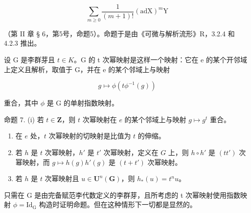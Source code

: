 \[
\sum_ {m \geqslant 0} \frac {1}{(m + 1) !} (\mathrm{adX}) ^ {m} \mathrm{Y}
\]

（第 II 章 § 6，第5号，命题5）。命题于是由《可微与解析流形》R，3.2.4 和 4.2.3 推出。

设 G 是李群芽且 \(t \in K\)。G 的 t 次幂映射是这样一个映射：它在 e 的某个开邻域上定义且解析，取值于 G，并在 e 的某个邻域上与映射

\[
g \mapsto \phi (t \phi^ {- 1} (g))
\]

重合，其中 \(\phi\) 是 G 的单射指数映射。

命题 7. (i) 若 \(t \in \mathbf{Z}\)，则 \(t\) 次幂映射在 \(e\) 的某个邻域上与映射 \(g \mapsto g^t\) 重合。

\begin{enumerate}
\def\labelenumi{(\roman{enumi})}
\setcounter{enumi}{1}
\item
  在 \(e\) 处，\(t\) 次幂映射的切映射是比值为 \(t\) 的伸缩。
\item
  若 \(h\) 是 \(t\) 次幂映射，\(h'\) 是 \(t'\) 次幂映射，定义在 \(G\) 上，则 \(h \circ h'\) 是 \((tt')\) 次幂映射，而 \(g \mapsto h(g)h'(g)\) 是 \((t + t')\) 次幂映射。
\item
  若 \(h\) 是 \(t\) 次幂映射且 \(u \in \mathbf{U}^n(\mathbf{G})\)，则 \(h_*(u) = t^n u\)。
\end{enumerate}

只需在 G 是由完备赋范李代数定义的李群芽，且所考虑的 t 次幂映射使用指数映射 \(\phi = \mathrm{Id}_{\mathrm{G}}\) 构造时证明命题。但在这种情形下一切都是显然的。

